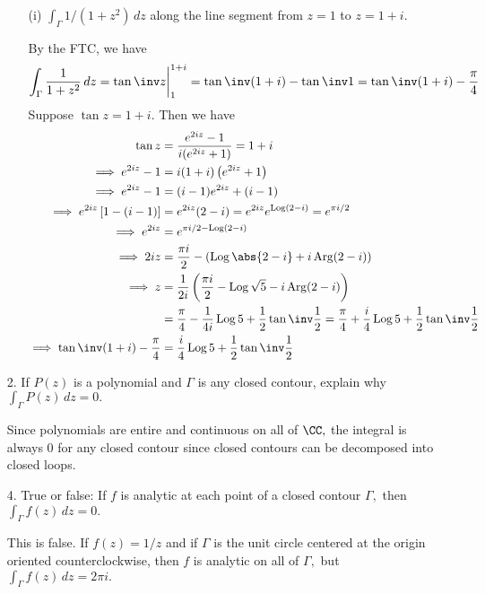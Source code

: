 \documentclass{article}
\DeclareMathOperator{\Log}{Log}
\DeclareMathOperator{\Arg}{Arg}
\begin{document}
\begin{itemize}
\begin{itemize}
			\item[(i)] $\int_\Gamma 1/(1+z^2)\, dz$ along the line segment from $z=1$ to $z=1+i.$
				\begin{soln}
					By the FTC, we have
					\begin{align*}
						\int_\Gamma \frac{1}{1+z^2}\, dz = \tan\inv z\bigg|_1^{1+i} = \tan\inv(1+i) - \tan\inv1 = \tan\inv(1+i) - \frac{\pi}{4}
					\end{align*}
					Suppose $\tan z = 1+i.$ Then we have
					\begin{align*}
						\tan z &= \frac{e^{2iz} - 1}{i(e^{2iz} + 1)} = 1+i \\
						\implies e^{2iz} - 1 &= i(1+i)\left( e^{2iz}+1 \right) \\
						\implies e^{2iz} - 1 &= (i-1)e^{2iz} + (i-1) \\
						\implies e^{2iz}\left[ 1-(i-1) \right] &= e^{2iz}(2-i) = e^{2iz}e^{\Log(2-i)}=e^{\pi i/2} \\
						\implies e^{2iz} &= e^{\pi i/2-\Log(2-i)} \\
						\implies 2iz &= \frac{\pi i}{2} - \left( \Log\abs{2-i} + i\Arg(2-i) \right) \\
						\implies z &= \frac{1}{2i} \left( \frac{\pi i}{2} - \Log\sqrt{5} - i\Arg(2-i) \right) \\
						&= \frac{\pi}{4} - \frac{1}{4i}\Log 5 + \frac{1}{2}\tan\inv\frac{1}{2} = \frac{\pi}{4} + \frac{i}{4}\Log 5 + \frac{1}{2}\tan\inv\frac{1}{2} \\
						\implies \tan\inv(1+i)-\frac{\pi}{4} &= \frac{i}{4}\Log 5 + \frac{1}{2}\tan\inv\frac{1}{2}
					\end{align*}
				\end{soln}
				
		\end{itemize}

	\item[2.] If $P(z)$ is a polynomial and $\Gamma$ is any closed contour, explain why $\int_\Gamma P(z)\, dz=0.$
		\begin{answer*}
			Since polynomials are entire and continuous on all of $\CC,$ the integral is always 0 for any closed contour since closed contours can be decomposed into closed loops.
		\end{answer*}

	\item[4.] True or false: If $f$ is analytic at each point of a closed contour $\Gamma,$ then $\int_{\Gamma}f(z)\, dz=0.$
		\begin{answer*}
			This is false. If $f(z)=1/z$ and if $\Gamma$ is the unit circle centered at the origin oriented counterclockwise, then $f$ is analytic on all of $\Gamma,$ but $\int_\Gamma f(z)\, dz = 2\pi i.$
		\end{answer*}


\end{itemize}
\end{document}

